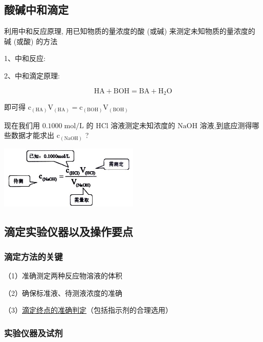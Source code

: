 \documentclass[10pt,cn]{elegantbook}
\begin{document}
	\subsection{酸碱中和滴定}
	
	利用中和反应原理, 用已知物质的量浓度的酸 (或碱) 来测定未知物质的量浓度的碱 (或酸) 的方法
	
	1、中和反应:
	
	2、中和滴定原理:
	
	\[
	\mathrm{{HA}} + \mathrm{{BOH}} = \mathrm{{BA}} + {\mathrm{H}}_{2}\mathrm{O}
	\]
	
	
	即可得 \({\mathrm{c}}_{\left( \mathrm{{HA}}\right) }{\mathrm{V}}_{\left( \mathrm{{HA}}\right) } = {\mathrm{c}}_{\left( \mathrm{{BOH}}\right) }{\mathrm{V}}_{\left( \mathrm{{BOH}}\right) }\)
	
	现在我们用 \({0.1000}\mathrm{\;{mol}}/\mathrm{L}\) 的 \(\mathrm{{HCl}}\) 溶液测定未知浓度的 \(\mathrm{{NaOH}}\) 溶液,到底应测得哪些数据才能求出 \({\mathrm{c}}_{\left( \mathrm{{NaOH}}\right) }\) ?
	
	\begin{center}
		\includegraphics[max width=0.5\textwidth]{image/c1.jpg}
	\end{center}
	
	\subsection{滴定实验仪器以及操作要点}
	
	\subsubsection{滴定方法的关键}
	
	（1）准确测定两种反应物溶液的体积
	
	（2）确保标准液、待测液浓度的准确
	
	（3）\uline{滴定终点的准确判定}（包括指示剂的合理选用）
	\subsubsection{实验仪器及试剂}
	
\end{document}
